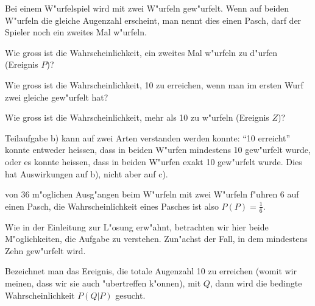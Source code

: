 Bei einem W"urfelspiel wird mit zwei W"urfeln gew"urfelt. Wenn
auf beiden W"urfeln die gleiche Augenzahl erscheint, man nennt dies
einen Pasch, darf
der Spieler noch ein zweites Mal w"urfeln.
\begin{teilaufgaben}
\item Wie gross ist die Wahrscheinlichkeit, ein zweites Mal w"urfeln
zu d"urfen (Ereignis $P$)?
\item Wie gross ist die Wahrscheinlichkeit, 10 zu erreichen,
wenn man im ersten Wurf zwei gleiche gew"urfelt hat?
\item Wie gross ist die
Wahrscheinlichkeit, mehr als 10 zu w"urfeln (Ereignis $Z$)?
\end{teilaufgaben}

\begin{loesung}
Teilaufgabe b) kann auf zwei
Arten verstanden werden konnte: ``10 erreicht'' konnte
entweder heissen, dass in beiden W"urfen mindestens 10 gew"urfelt wurde,
oder es konnte heissen, dass in beiden W"urfen exakt 10 gew"urfelt wurde.
Dies hat Auswirkungen auf b), nicht aber auf c).

\begin{teilaufgaben}
\item von 36 m"oglichen Ausg"angen beim W"urfeln mit zwei W"urfeln
f"uhren 6 auf einen Pasch, die Wahrscheinlichkeit eines Pasches
ist also $P(P)=\frac16$.
\item
Wie in der Einleitung zur L"osung erw"ahnt, betrachten wir hier beide
M"oglichkeiten, die Aufgabe zu verstehen. Zun"achst der Fall, in
dem mindestens Zehn gew"urfelt wird.

Bezeichnet man das Ereignis, die totale Augenzahl 10 zu erreichen (womit
wir meinen, dass wir sie auch "ubertreffen k"onnen), mit
$Q$, dann wird die bedingte Wahrscheinlichkeit $P(Q|P)$ gesucht.


\end{teilaufgaben}
\end{loesung}
